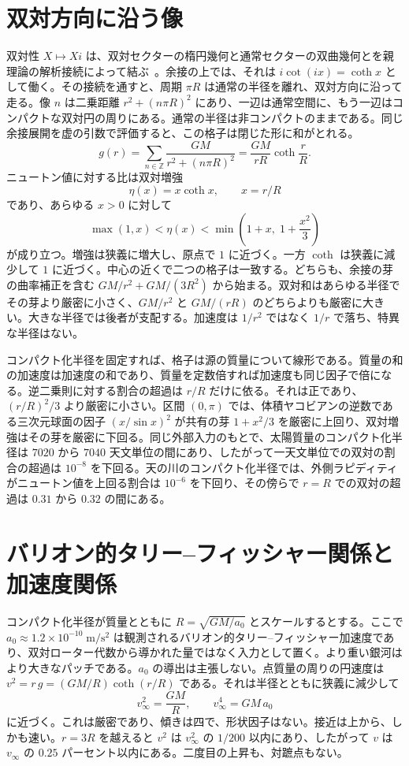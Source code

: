 \documentclass[a4paper]{article}
\begin{document}
\section{双対方向に沿う像}
\label{sec:dual}

双対性 $X\mapsto Xi$ は、双対セクターの楕円幾何と通常セクターの双曲幾何とを親理論の解析接続によって結ぶ~\cite{dst-main}。余接の上では、それは $i\cot(ix)=\coth x$ として働く。その接続を通すと、周期 $\pi R$ は通常の半径を離れ、双対方向に沿って走る。像 $n$ は二乗距離 $r^2+(n\pi R)^2$ にあり、一辺は通常空間に、もう一辺はコンパクトな双対円の周りにある。通常の半径は非コンパクトのままである。同じ余接展開を虚の引数で評価すると、この格子は閉じた形に和がとれる。
\begin{equation}
\label{eq:dual-lattice}
g(r)=\sum_{n\in\mathbb{Z}}\frac{GM}{r^2+(n\pi R)^2}=\frac{GM}{rR}\coth\frac{r}{R}.
\end{equation}
ニュートン値に対する比は双対増強
\[
\eta(x)=x\coth x, \qquad x=r/R
\]
であり、あらゆる $x>0$ に対して
\[
\max(1,x)<\eta(x)<\min\!\left(1+x,\;1+\frac{x^2}{3}\right)
\]
が成り立つ。増強は狭義に増大し、原点で $1$ に近づく。一方 $\coth$ は狭義に減少して $1$ に近づく。中心の近くで二つの格子は一致する。どちらも、余接の芽の曲率補正を含む $GM/r^2+GM/(3R^2)$ から始まる。双対和はあらゆる半径でその芽より厳密に小さく、$GM/r^2$ と $GM/(rR)$ のどちらよりも厳密に大きい。大きな半径では後者が支配する。加速度は $1/r^2$ ではなく $1/r$ で落ち、特異な半径はない。

コンパクト化半径を固定すれば、格子は源の質量について線形である。質量の和の加速度は加速度の和であり、質量を定数倍すれば加速度も同じ因子で倍になる。逆二乗則に対する割合の超過は $r/R$ だけに依る。それは正であり、$(r/R)^2/3$ より厳密に小さい。区間 $(0,\pi)$ では、体積ヤコビアンの逆数である三次元球面の因子 $(x/\sin x)^2$ が共有の芽 $1+x^2/3$ を厳密に上回り、双対増強はその芽を厳密に下回る。同じ外部入力のもとで、太陽質量のコンパクト化半径は $7020$ から $7040$ 天文単位の間にあり、したがって一天文単位での双対の割合の超過は $10^{-8}$ を下回る。天の川のコンパクト化半径では、外側ラピディティがニュートン値を上回る割合は $10^{-6}$ を下回り、その傍らで $r=R$ での双対の超過は $0.31$ から $0.32$ の間にある。

\section{バリオン的タリー--フィッシャー関係と加速度関係}
\label{subsec:btfr}

コンパクト化半径が質量とともに $R=\sqrt{GM/a_0}$ とスケールするとする。ここで $a_0 \approx 1.2 \times 10^{-10}\;\mathrm{m/s^2}$ は観測されるバリオン的タリー--フィッシャー加速度であり、双対ローター代数から導かれた量ではなく入力として置く。より重い銀河はより大きなパッチである。$a_0$ の導出は主張しない。点質量の周りの円速度は $v^2=r\,g=(GM/R)\coth(r/R)$ である。それは半径とともに狭義に減少して
\[
v_\infty^2=\frac{GM}{R}, \qquad v_\infty^4=GM\,a_0
\]
に近づく。これは厳密であり、傾きは四で、形状因子はない。接近は上から、しかも速い。$r=3R$ を越えると $v^2$ は $v_\infty^2$ の $1/200$ 以内にあり、したがって $v$ は $v_\infty$ の $0.25$ パーセント以内にある。二度目の上昇も、対蹠点もない。
\end{document}
